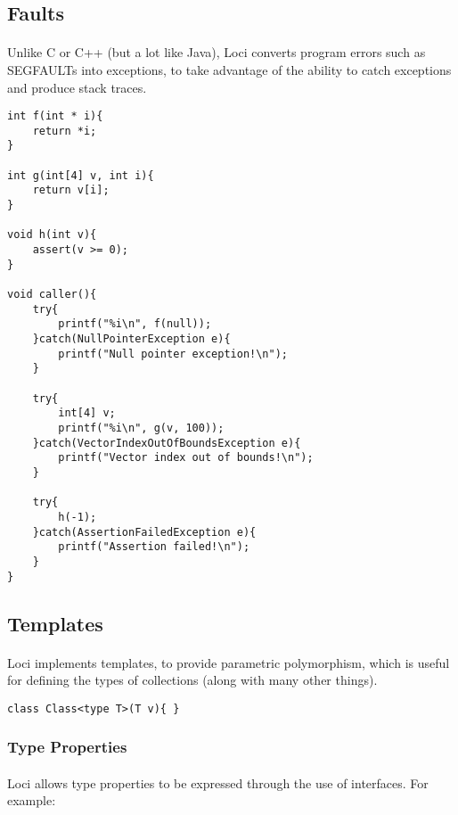 \documentclass[12pt,twoside,notitlepage]{report}
\begin{document}
\subsection{Faults}

\paragraph{}
Unlike C or C++ (but a lot like Java), Loci converts program errors such as SEGFAULTs into exceptions, to take advantage of the ability to catch exceptions and produce stack traces.

\small{
\begin{verbatim}
int f(int * i){
    return *i;
}

int g(int[4] v, int i){
    return v[i];
}

void h(int v){
    assert(v >= 0);
}

void caller(){
    try{
        printf("%i\n", f(null));
    }catch(NullPointerException e){
        printf("Null pointer exception!\n");
    }
    
    try{
        int[4] v;
        printf("%i\n", g(v, 100));
    }catch(VectorIndexOutOfBoundsException e){
        printf("Vector index out of bounds!\n");
    }
    
    try{
        h(-1);
    }catch(AssertionFailedException e){
        printf("Assertion failed!\n");
    }
}
\end{verbatim}
}

\subsection{Templates}

\paragraph{}
Loci implements templates, to provide parametric polymorphism, which is useful for defining the types of collections (along with many other things).

\small{
\begin{verbatim}
class Class<type T>(T v){ }
\end{verbatim}
}

\subsubsection{Type Properties}

\paragraph{}
Loci allows type properties to be expressed through the use of interfaces. For example:
\end{document}
